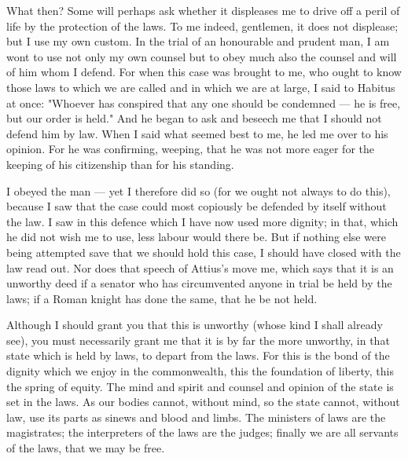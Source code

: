  What then? Some will perhaps ask whether it displeases me to drive off a peril of life by the protection of the laws. To me indeed, gentlemen, it does not displease; but I use my own custom. In the trial of an honourable and prudent man, I am wont to use not only my own counsel but to obey much also the counsel and will of him whom I defend. For when this case was brought to me, who ought to know those laws to which we are called and in which we are at large, I said to Habitus at once: "Whoever has conspired that any one should be condemned --- he is free, but our order is held." And he began to ask and beseech me that I should not defend him by law. When I said what seemed best to me, he led me over to his opinion. For he was confirming, weeping, that he was not more eager for the keeping of his citizenship than for his standing.

 I obeyed the man --- yet I therefore did so (for we ought not always to do this), because I saw that the case could most copiously be defended by itself without the law. I saw in this defence which I have now used more dignity; in that, which he did not wish me to use, less labour would there be. But if nothing else were being attempted save that we should hold this case, I should have closed with the law read out. Nor does that speech of Attius's move me, which says that it is an unworthy deed if a senator who has circumvented anyone in trial be held by the laws; if a Roman knight has done the same, that he be not held.

 Although I should grant you that this is unworthy (whose kind I shall already see), you must necessarily grant me that it is by far the more unworthy, in that state which is held by laws, to depart from the laws. For this is the bond of the dignity which we enjoy in the commonwealth, this the foundation of liberty, this the spring of equity. The mind and spirit and counsel and opinion of the state is set in the laws. As our bodies cannot, without mind, so the state cannot, without law, use its parts as sinews and blood and limbs. The ministers of laws are the magistrates; the interpreters of the laws are the judges; finally we are all servants of the laws, that we may be free.

